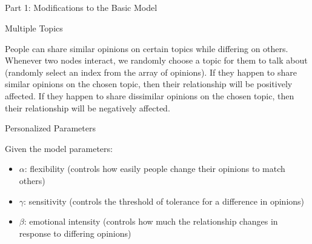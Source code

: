 \documentclass[11pt]{article}
\providecommand{\tightlist}{%
      \setlength{\itemsep}{0pt}\setlength{\parskip}{0pt}}
\begin{document}
    \begin{center}
    \end{center}
    { \hspace*{\fill} \\}
    
    \begin{center}
    \end{center}
    { \hspace*{\fill} \\}
    
    \begin{center}
    \end{center}
    { \hspace*{\fill} \\}
    
    \begin{center}
    \end{center}
    { \hspace*{\fill} \\}
    
    Part 1: Modifications to the Basic Model

Multiple Topics

People can share similar opinions on certain topics while differing on
others. Whenever two nodes interact, we randomly choose a topic for them
to talk about (randomly select an index from the array of opinions). If
they happen to share similar opinions on the chosen topic, then their
relationship will be positively affected. If they happen to share
dissimilar opinions on the chosen topic, then their relationship will be
negatively affected.

Personalized Parameters

Given the model parameters:

\begin{itemize}
\tightlist
\item
  \(\alpha\): flexibility (controls how easily people change their
  opinions to match others)
\item
  \(\gamma\): sensitivity (controls the threshold of tolerance for a
  difference in opinions)
\item
  \(\beta\): emotional intensity (controls how much the relationship
  changes in response to differing opinions)
\end{itemize}
\end{document}
